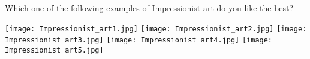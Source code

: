 \begin{tcolorbox}
Which one of the following examples of Impressionist art do you like the best?

\texttt{[image: Impressionist\_art1.jpg]}
\texttt{[image: Impressionist\_art2.jpg]}
\texttt{[image: Impressionist\_art3.jpg]}
\texttt{[image: Impressionist\_art4.jpg]}
\texttt{[image: Impressionist\_art5.jpg]}
\end{tcolorbox}
